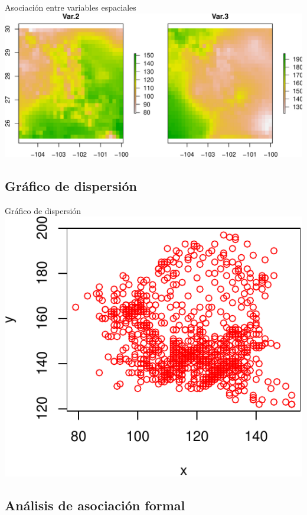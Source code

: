 \documentclass[
  11pt,
  ignorenonframetext,
]{beamer}
\begin{document}
\begin{frame}{Asociación entre variables espaciales}
\includegraphics{Intro-asociacion_files/figure-beamer/unnamed-chunk-5-1.pdf}
\end{frame}

\hypertarget{gruxe1fico-de-dispersiuxf3n}{%
\subsection{Gráfico de dispersión}\label{gruxe1fico-de-dispersiuxf3n}}

\begin{frame}{Gráfico de dispersión}
\includegraphics{Intro-asociacion_files/figure-beamer/unnamed-chunk-6-1.pdf}
\end{frame}

\hypertarget{anuxe1lisis-de-asociaciuxf3n-formal}{%
\subsection{Análisis de asociación
formal}\label{anuxe1lisis-de-asociaciuxf3n-formal}}
\end{document}
